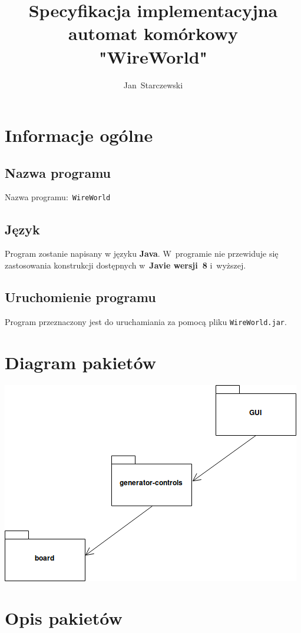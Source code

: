 \documentclass[a4paper,11pt]{article}
\author{Jan~Starczewski}
\title{
	\Huge Specyfikacja implementacyjna \\
	automat komórkowy\\
	\textbf{"WireWorld"}
}
\begin{document}
	\maketitle 
	\newpage
	\tableofcontents 
	\newpage
	\section {Informacje ogólne}
		\subsection{Nazwa programu}
			Nazwa programu:~\texttt{WireWorld}
		\subsection{Język}
		Program zostanie napisany w języku \textbf{Java}. W~programie nie przewiduje się zastosowania konstrukcji dostępnych w~\textbf{Javie wersji~8} i~wyższej. 
		\subsection{Uruchomienie programu}
				Program przeznaczony jest do uruchamiania za pomocą pliku \texttt{WireWorld.jar}.
		\newpage
    \section{Diagram pakietów}
    \begin{center}
 \includegraphics[scale=0.6]{images/diagram_pakiety.png}
\end{center}

    \section{Opis pakietów}
\end{document}
